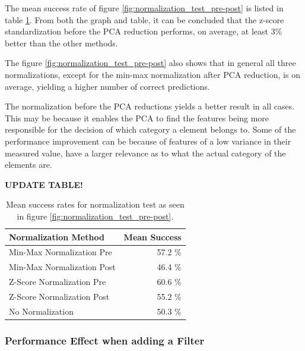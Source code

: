 The mean success rate of figure \ref{fig:normalization_test_pre-post} is listed in table \ref{tab:meanSuccess_normalization_test_pre-post}.
From both the graph and table, it can be concluded that the z-score standardization before the PCA reduction performs, on average, at least 3\% better than the other methods.

The figure \ref{fig:normalization_test_pre-post} also shows that in general all three normalizations, except for the min-max normalization after PCA reduction, is on average, yielding a higher number of correct predictions.

The normalization before the PCA reductions yields a better result in all cases. 
This may be because it enables the PCA to find the features being more responsible for the decision of which category a element belongs to. 
Some of the performance improvement can be because of features of a low variance in their measured value, have a larger relevance as to what the actual category of the elements are.

\textbf{UPDATE TABLE!}

\begin{table}[H]
\centering
\begin{tabular}{|l|r|}\hline
Normalization Method & Mean Success \\ \hline
Min-Max Normalization Pre & 57.2 \% \\ \hline
Min-Max Normalization Post & 46.4 \% \\ \hline
Z-Score Normalization Pre & 60.6 \% \\ \hline
Z-Score Normalization Post & 55.2  \% \\ \hline
No Normalization & 50.3 \% \\ \hline
\end{tabular}
\caption{Mean success rates for normalization test as seen in figure \ref{fig:normalization_test_pre-post}.}
\label{tab:meanSuccess_normalization_test_pre-post}
\end{table}



\subsubsection{Performance Effect when adding a Filter}

